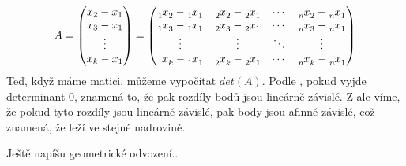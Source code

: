 \begingroup
\renewcommand*{\arraystretch}{1.25}
\delimitershortfall=0pt
\begin{equation*}
  A =
  \begin{pmatrix}
    x_2-x_1 \\
    x_3-x_1 \\
    \vdots  \\
    x_k-x_1
  \end{pmatrix}
  =
  \begin{pmatrix}
    \x{1}{2} - \x{1}{1} & \x{2}{2} - \x{2}{1} & \cdots & \x{n}{2} - \x{n}{1} \\
    \x{1}{3} - \x{1}{1} & \x{2}{3} - \x{2}{1} & \cdots & \x{n}{3} - \x{n}{1} \\
    \vdots        & \vdots        & \ddots & \vdots        \\
    \x{1}{k} - \x{1}{1} & \x{2}{k} - \x{2}{1} & \cdots & \x{n}{k} - \x{n}{1} \\
  \end{pmatrix}
\end{equation*}
\endgroup
Teď, když máme matici, můžeme vypočítat $det(A)$. Podle , pokud vyjde determinant $0$, znamená to, že pak rozdíly bodů jsou lineárně závislé. Z  ale víme, že pokud tyto rozdíly jsou lineárně závislé, pak body jsou afinně závislé, což znamená, že leží ve stejné nadrovině.  

Ještě napíšu geometrické odvození..